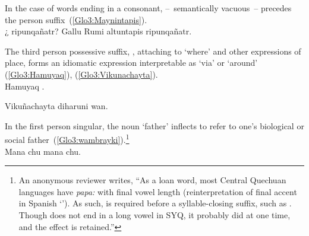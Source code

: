\noindent
In the case of words ending in a consonant,  --~semantically vacuous~-- precedes the person suffix~(\ref{Glo3:Maynintapis}).\\

%
{¿ ripunqañatr? Gallu Rumi altuntapis ripunqañatr.}%
{}%
{}{}%

\noindent
The third person possessive suffix, , attaching to  ‘where’ and other expressions of place, forms an idiomatic expression interpretable as ‘via’ or ‘around’ (\ref{Glo3:Hamuyaq}), (\ref{Glo3:Vikunachayta}).\\

%
{Hamuyaq .}%
{}%
{}{}%

%
{Vikuñachayta diharuni wan.}%
{}%
{}{}%

\noindent
In the first person singular, the noun  ‘father’ inflects  to refer to one’s biological or social father~(\ref{Glo3:wambrayki}).\footnote{An anonymous reviewer writes, “As a loan word, most Central Quechuan languages have \emph{papa:} with final vowel length (reinterpretation of final accent in Spanish ‘’). As such,  is required before a syllable-closing suffix, such as . Though  does not end in a long vowel in SYQ, it probably did at one time, and the effect is retained.”}\\

%
{Mana  chu mana  chu.}%
{}%
{}{}%

